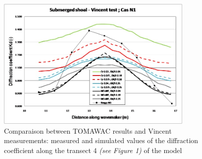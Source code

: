 \begin{figure}[!h]
  \centering
    \includegraphics[width=0.85\textwidth]{Kd.jpg}
      \caption{Comparaison between TOMAWAC results and Vincent measurements: measured and simulated values of the diffraction coefficient along the transect 4 \textit{(see Figure 1)} of the model}
\end{figure}

